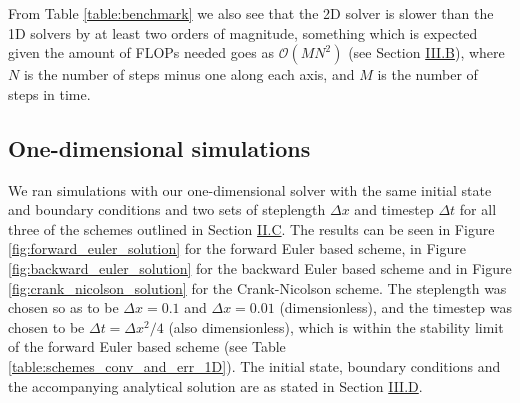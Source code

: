 \documentclass[reprint,english,notitlepage]{revtex4-1}  %
\begin{document}
From Table \ref{table:benchmark} we also see that the 2D solver is slower than the 1D solvers by at least two orders of magnitude, something which is expected given the amount of FLOPs needed goes as \(\mathcal{O}(MN^{2})\) (see Section \hyperref[sec:method_2D_solver]{III.B}), where \(N\) is the number of steps minus one along each axis, and \(M\) is the number of steps in time.


\subsection{One-dimensional simulations} \label{sec:discussion_1D}

We ran simulations with our one-dimensional solver with the same initial state and boundary conditions and two sets of steplength $\Delta x$ and timestep $\Delta t$ for all three of the schemes outlined in Section \hyperref[sec:formalism_numerical_1D]{II.C}. The results can be seen in Figure \ref{fig:forward_euler_solution} for the forward Euler based scheme, in Figure \ref{fig:backward_euler_solution} for the backward Euler based scheme and in Figure \ref{fig:crank_nicolson_solution} for the Crank-Nicolson scheme. The steplength was chosen so as to be $\Delta x = 0.1$ and $\Delta x = 0.01$ (dimensionless), and the timestep was chosen to be $\Delta t = \Delta x^{2}/4$ (also dimensionless), which is within the stability limit of the forward Euler based scheme (see Table \ref{table:schemes_conv_and_err_1D}). The initial state, boundary conditions and the accompanying analytical solution are as stated in Section \hyperref[sec:method_1D_sims]{III.D}.
\end{document}

